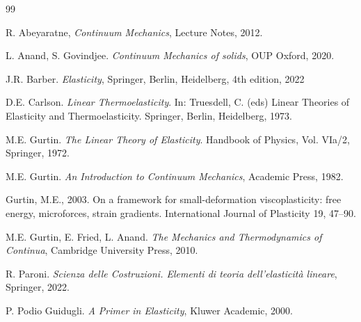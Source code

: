 \newpage



\begin{thebibliography}{99}

%

 R. Abeyaratne, \textit{Continuum Mechanics},  Lecture Notes, 2012.

L. Anand, S. Govindjee. \textit{Continuum Mechanics of solids}, OUP Oxford, 2020.



J.R. Barber. \textit{Elasticity},  Springer, Berlin, Heidelberg, 4th edition, 2022

 D.E. Carlson. \textit{Linear Thermoelasticity}. In: Truesdell, C. (eds) Linear Theories of Elasticity and Thermoelasticity. Springer, Berlin, Heidelberg,  1973.

M.E. Gurtin. \textit{The Linear Theory of Elasticity}. Handbook of Physics, Vol. VIa/2, Springer, 1972.

M.E. Gurtin. \textit{An Introduction to Continuum Mechanics}, Academic Press, 1982.

Gurtin, M.E., 2003. On a framework for small-deformation viscoplasticity: free
energy, microforces, strain gradients. International Journal of Plasticity 19, 47--90.

M.E. Gurtin, E. Fried, L. Anand. \textit{The Mechanics and Thermodynamics of Continua}, Cambridge University Press, 2010.


R. Paroni. \textit{Scienza delle Costruzioni.  Elementi di teoria dell’elasticità lineare}, Springer, 2022.

P. Podio Guidugli. \textit{A Primer in Elasticity}, Kluwer Academic, 2000.


\end{thebibliography}
